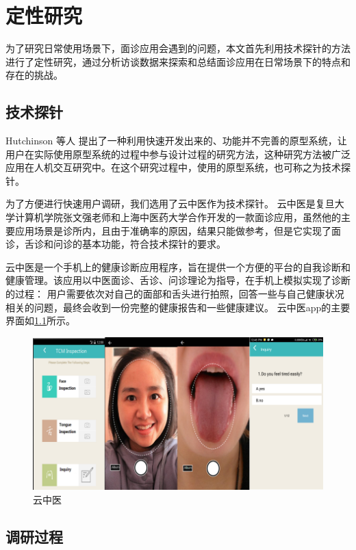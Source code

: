 \chapter{定性研究}

为了研究日常使用场景下，面诊应用会遇到的问题，本文首先利用技术探针\cite{Hutchinson2003Technology}的方法进行了定性研究，通过分析访谈数据来探索和总结面诊应用在日常场景下的特点和存在的挑战。


\section{技术探针}

Hutchinson 等人 提出了一种利用快速开发出来的、功能并不完善的原型系统，让用户在实际使用原型系统的过程中参与设计过程的研究方法，这种研究方法被广泛应用在人机交互研究中。在这个研究过程中，使用的原型系统，也可称之为技术探针。

为了方便进行快速用户调研，我们选用了云中医\cite{Zhang2018Study}作为技术探针。
云中医是复旦大学计算机学院张文强老师和上海中医药大学合作开发的一款面诊应用，虽然他的主要应用场景是诊所内，且由于准确率的原因，结果只能做参考，但是它实现了面诊，舌诊和问诊的基本功能，符合技术探针的要求。

云中医是一个手机上的健康诊断应用程序，旨在提供一个方便的平台的自我诊断和健康管理。该应用以中医面诊、舌诊、问诊理论为指导，在手机上模拟实现了诊断的过程：
用户需要依次对自己的面部和舌头进行拍照，回答一些与自己健康状况相关的问题，最终会收到一份完整的健康报告和一些健康建议。
云中医app的主要界面如\ref{fig:main}所示。

\begin{figure}
    \centering
    \includegraphics{images/main.png}
    \caption{云中医}
    \label{fig:main}
\end{figure}

\section{调研过程}
 
